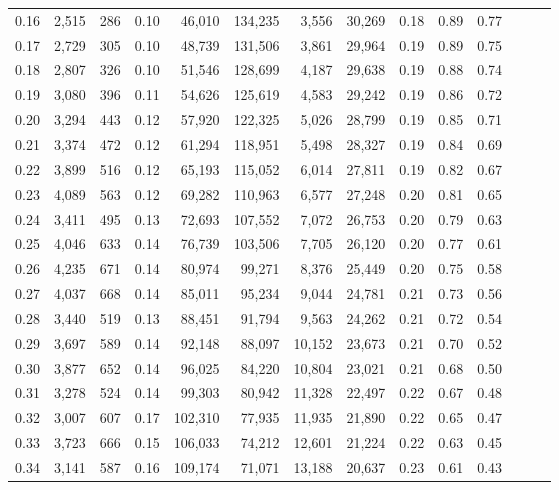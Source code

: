 \begin{tabular}{rrrrrrrrrrrrrr}
0.16 &  2,515 &  286 &  0.10 &   46,010 &  134,235 &   3,556 &  30,269 &  0.18 &  0.89 &      0.77 \\
0.17 &  2,729 &  305 &  0.10 &   48,739 &  131,506 &   3,861 &  29,964 &  0.19 &  0.89 &      0.75 \\
0.18 &  2,807 &  326 &  0.10 &   51,546 &  128,699 &   4,187 &  29,638 &  0.19 &  0.88 &      0.74 \\
0.19 &  3,080 &  396 &  0.11 &   54,626 &  125,619 &   4,583 &  29,242 &  0.19 &  0.86 &      0.72 \\
0.20 &  3,294 &  443 &  0.12 &   57,920 &  122,325 &   5,026 &  28,799 &  0.19 &  0.85 &      0.71 \\
0.21 &  3,374 &  472 &  0.12 &   61,294 &  118,951 &   5,498 &  28,327 &  0.19 &  0.84 &      0.69 \\
0.22 &  3,899 &  516 &  0.12 &   65,193 &  115,052 &   6,014 &  27,811 &  0.19 &  0.82 &      0.67 \\
0.23 &  4,089 &  563 &  0.12 &   69,282 &  110,963 &   6,577 &  27,248 &  0.20 &  0.81 &      0.65 \\
0.24 &  3,411 &  495 &  0.13 &   72,693 &  107,552 &   7,072 &  26,753 &  0.20 &  0.79 &      0.63 \\
0.25 &  4,046 &  633 &  0.14 &   76,739 &  103,506 &   7,705 &  26,120 &  0.20 &  0.77 &      0.61 \\
0.26 &  4,235 &  671 &  0.14 &   80,974 &   99,271 &   8,376 &  25,449 &  0.20 &  0.75 &      0.58 \\
0.27 &  4,037 &  668 &  0.14 &   85,011 &   95,234 &   9,044 &  24,781 &  0.21 &  0.73 &      0.56 \\
0.28 &  3,440 &  519 &  0.13 &   88,451 &   91,794 &   9,563 &  24,262 &  0.21 &  0.72 &      0.54 \\
0.29 &  3,697 &  589 &  0.14 &   92,148 &   88,097 &  10,152 &  23,673 &  0.21 &  0.70 &      0.52 \\
0.30 &  3,877 &  652 &  0.14 &   96,025 &   84,220 &  10,804 &  23,021 &  0.21 &  0.68 &      0.50 \\
0.31 &  3,278 &  524 &  0.14 &   99,303 &   80,942 &  11,328 &  22,497 &  0.22 &  0.67 &      0.48 \\
0.32 &  3,007 &  607 &  0.17 &  102,310 &   77,935 &  11,935 &  21,890 &  0.22 &  0.65 &      0.47 \\
0.33 &  3,723 &  666 &  0.15 &  106,033 &   74,212 &  12,601 &  21,224 &  0.22 &  0.63 &      0.45 \\
0.34 &  3,141 &  587 &  0.16 &  109,174 &   71,071 &  13,188 &  20,637 &  0.23 &  0.61 &      0.43 \\

\end{tabular}

